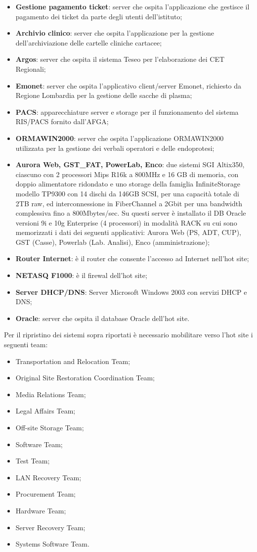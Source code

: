 \documentclass[12pt, a4paper, titlepage]{report}
\begin{document}
	\begin{itemize}
		\item \textbf{Gestione pagamento ticket}: server che ospita l'applicazione che gestisce il pagamento dei ticket da parte degli utenti dell'istituto;
		\item \textbf{Archivio clinico}: server che ospita l'applicazione per la gestione dell'archiviazione delle cartelle cliniche cartacee;
		\item \textbf{Argos}: server che ospita il sistema Teseo per l'elaborazione dei CET Regionali;
		\item \textbf{Emonet}: server che ospita l'applicativo client/server Emonet, richiesto da Regione Lombardia per la gestione delle sacche di plasma;
		\item \textbf{PACS}: apparecchiature server e storage per il funzionamento del sistema RIS/PACS fornito dall'AFGA;
		\item \textbf{ORMAWIN2000}: server che ospita l'applicazione ORMAWIN2000 utilizzata per la gestione dei verbali operatori e delle endoprotesi;
		\item \textbf{Aurora Web, GST\_FAT, PowerLab, Enco}: due sistemi SGI Altix350, ciascuno con 2 processori Mips R16k a 800MHz e 16 GB di memoria, con doppio alimentatore ridondato e uno storage della famiglia InfiniteStorage modello TP9300 con 14 dischi da 146GB SCSI, per una capacità totale di 2TB raw, ed interconnessione in FiberChannel a 2Gbit per una bandwidth complessiva fino a 800Mbytes/sec. Su questi server è installato il DB Oracle versioni 9i e 10g Enterprise (4 processori) in modalità RACK su cui sono memorizzati i dati dei seguenti applicativi: Aurora Web (PS, ADT, CUP), GST (Casse), Powerlab (Lab. Analisi), Enco (amministrazione);
		\item \textbf{Router Internet}: è il router che consente l'accesso ad Internet nell'hot site;
		\item \textbf{NETASQ F1000}: è il firewal dell'hot site;
		\item \textbf{Server DHCP/DNS}: Server Microsoft Windows 2003 con servizi DHCP e DNS;
		\item \textbf{Oracle}: server che ospita il database Oracle dell'hot site.
	\end{itemize}
	Per il ripristino dei sistemi sopra riportati è necessario mobilitare verso l'hot site i seguenti team:
	\begin{itemize}
		\item Transportation and Relocation Team;
		\item Original Site Restoration Coordination Team;
		\item Media Relations Team;
		\item Legal Affairs Team;
		\item Off-site Storage Team;
		\item Software Team;
		\item Test Team;
		\item LAN Recovery Team;
		\item Procurement Team;
		\item Hardware Team;
		\item Server Recovery Team;
		\item Systems Software Team.
	\end{itemize}
	\newpage
\end{document}

